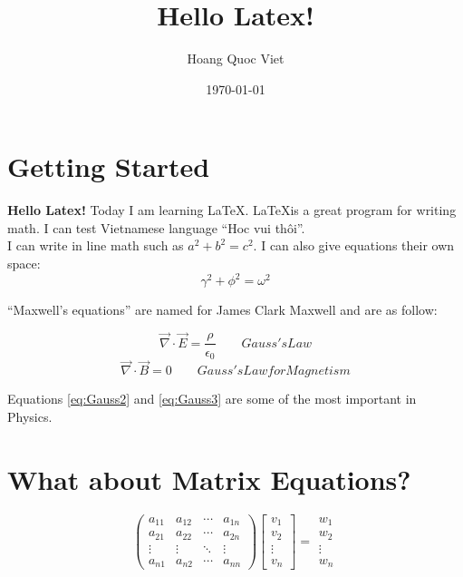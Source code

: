 \documentclass{article}
\title{Hello Latex!}
\author{Hoang Quoc Viet}
\date{\today}
\begin{document}
\maketitle

\section{Getting Started}
\textbf{Hello Latex!} Today I am learning \LaTeX. \LaTeX is a great program for writing math. I can test Vietnamese language ``Hoc vui thôi''.
\\
\indent I can write in line math such as $a^2 + b^2 = c^2$. I can also give equations their own space:
\begin{equation}
    \gamma^2 + \phi^2 = \omega^2
\end{equation}

``Maxwell’s equations'' are named for James Clark Maxwell and are as follow:

\begin{equation} \label{eq:Gauss2}
\vec{\nabla} \cdot \vec{E} =\frac{\rho}{\epsilon_{0}}  \qquad { Gauss's Law }
\end{equation}
\begin{equation} \label{eq:Gauss3}
\vec{\nabla} \cdot \vec{B} = 0 \qquad { Gauss's Law for Magnetism }
\end{equation}  


Equations \ref{eq:Gauss2} and \ref{eq:Gauss3} are some of the most important in Physics.

\section{What about Matrix Equations?}
$$
    \begin{pmatrix}
        a_{11} & a_{12} & \cdots & a_{1n}\\
        a_{21} & a_{22} & \cdots & a_{2n}\\
        \vdots & \vdots & \ddots & \vdots\\
        a_{n1} & a_{n2} & \cdots & a_{nn}
    \end{pmatrix}
    \begin{bmatrix}
        v_1\\
        v_2\\
        \vdots\\
        v_n
    \end{bmatrix}
    =
    \begin{matrix}
        w_1\\
        w_2\\
        \vdots\\
        w_n
    \end{matrix}
$$
\end{document}
